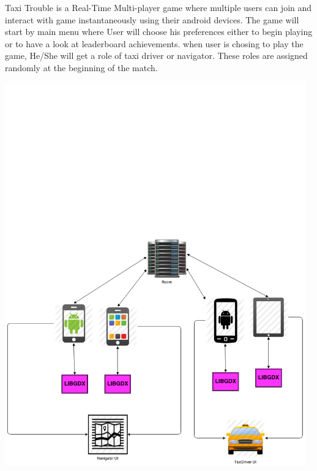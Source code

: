 
Taxi Trouble is a Real-Time Multi-player game where multiple users can join and interact with game instantaneously using their android devices. The game will start by main menu where User will choose his preferences either to begin playing or to have a look at leaderboard achievements. when user is chosing to play the game, He/She will get a role of taxi driver or navigator. These roles are assigned randomly at the beginning of the match.\\


\begin{center}
	 \includegraphics[width=130mm]{./images/Sprint2_softhard2.png}
\end{center}